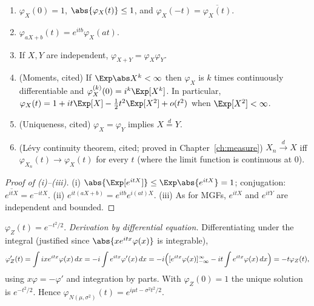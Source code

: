 \begin{theorem}[Properties]\label{thm:cfprops}
\begin{enumerate}[label=(\roman*)]
\item $\varphi_X(0)=1$, $\abs{\varphi_X(t)}\le1$, and $\varphi_X(-t)=\overline{\varphi_X(t)}$.
\item $\varphi_{aX+b}(t)=e^{itb}\varphi_X(at)$.
\item If $X,Y$ are independent, $\varphi_{X+Y}=\varphi_X\varphi_Y$.
\item (Moments, cited) If $\Exp\abs X^k<\infty$ then $\varphi_X$ is $k$ times
continuously differentiable and $\varphi_X^{(k)}(0)=i^k\Exp[X^k]$. In particular,
$\varphi_X(t)=1+it\Exp[X]-\tfrac12t^2\Exp[X^2]+o(t^2)$ when $\Exp[X^2]<\infty$.
\item (Uniqueness, cited) $\varphi_X=\varphi_Y$ implies $X\overset d=Y$.
\item (L\'evy continuity theorem, cited; proved in Chapter~\ref{ch:measure})
$X_n\xrightarrow{d}X$ iff $\varphi_{X_n}(t)\to\varphi_X(t)$ for every $t$ (where the
limit function is continuous at $0$).
\end{enumerate}
\end{theorem}
\begin{proof}[Proof of (i)--(iii)]
(i) $\abs{\Exp[e^{itX}]}\le\Exp\abs{e^{itX}}=1$; conjugation: $\overline{e^{itX}}=e^{-itX}$.
(ii) $e^{it(aX+b)}=e^{itb}e^{i(at)X}$. (iii) As for MGFs, $e^{itX}$ and $e^{itY}$ are
independent and bounded.
\end{proof}

\begin{example}\label{ex:cfnormal}
$\varphi_Z(t)=e^{-t^2/2}$. \emph{Derivation by differential equation.} Differentiating
under the integral (justified since $\abs{xe^{itx}\varphi(x)}$ is integrable),
\[
\varphi_Z'(t)=\int ix e^{itx}\varphi(x)\,dx=-i\int e^{itx}\varphi'(x)\,dx
=-i\Bigl([e^{itx}\varphi(x)]_{-\infty}^\infty-it\int e^{itx}\varphi(x)\,dx\Bigr)=-t\varphi_Z(t),
\]
using $x\varphi=-\varphi'$ and integration by parts. With $\varphi_Z(0)=1$ the unique
solution is $e^{-t^2/2}$. Hence $\varphi_{N(\mu,\sigma^2)}(t)=e^{i\mu t-\sigma^2t^2/2}$.
\end{example}

